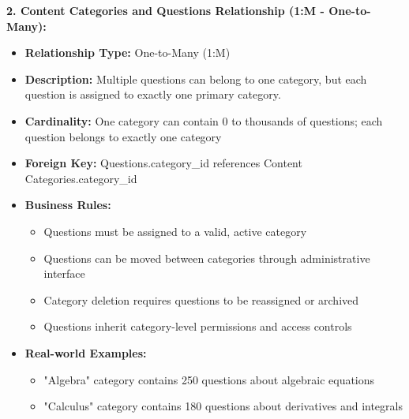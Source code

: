 \documentclass[12pt,a4paper,oneside]{book}
\begin{document}
\textbf{2. Content Categories and Questions Relationship (1:M - One-to-Many):}
\begin{itemize}
    \item \textbf{Relationship Type:} One-to-Many (1:M)
    \item \textbf{Description:} Multiple questions can belong to one category, but each question is assigned to exactly one primary category.
    \item \textbf{Cardinality:} One category can contain 0 to thousands of questions; each question belongs to exactly one category
    \item \textbf{Foreign Key:} Questions.category\_id references Content Categories.category\_id
    \item \textbf{Business Rules:}
        \begin{itemize}
            \item Questions must be assigned to a valid, active category
            \item Questions can be moved between categories through administrative interface
            \item Category deletion requires questions to be reassigned or archived
            \item Questions inherit category-level permissions and access controls
        \end{itemize}
    \item \textbf{Real-world Examples:}
        \begin{itemize}
            \item "Algebra" category contains 250 questions about algebraic equations
            \item "Calculus" category contains 180 questions about derivatives and integrals
        \end{itemize}
\end{itemize}
\end{document}
